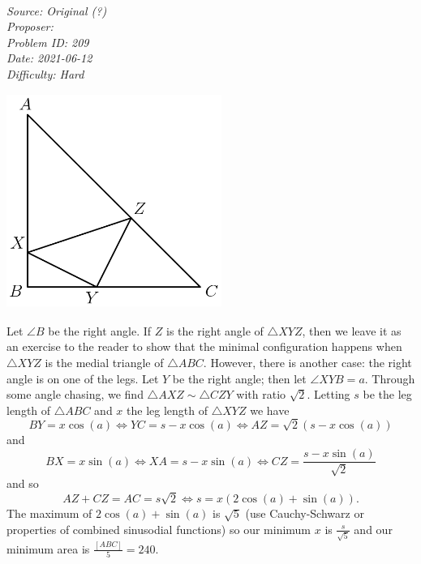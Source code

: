 \SSbreak\\
\emph{Source: Original (?)}\\
\emph{Proposer: \Pmatt}\\ %
\emph{Problem ID: 209}\\
\emph{Date: 2021-06-12}\\
\emph{Difficulty: Hard}\\
\SSbreak

\bigskip

\begin{solution}\hfil\medskip

	\includegraphics[width=7cm,height=7cm]{Sections/Files/O-matt-trianglemin.png}
	
	Let $\angle B$ be the right angle. If $Z$ is the right angle of $\triangle XYZ$, then we leave it as an exercise to the reader to show that the minimal 
	configuration happens when $\triangle XYZ$ is the medial triangle of $\triangle ABC$. However, there is another case: the right angle is on one of the legs. 
	Let $Y$ be the right angle; then let $\angle XYB = a$. Through some angle chasing, we find $\triangle AXZ \sim \triangle CZY$ with ratio $\sqrt{2}$. Letting $s$ be the leg length
	of $\triangle ABC$ and $x$ the leg length of $\triangle XYZ$ we have $$BY = x \cos(a) \iff YC = s - x \cos(a) \iff AZ = \sqrt{2}(s - x\cos(a))$$ and 
	$$BX = x\sin(a) \iff XA = s - x\sin(a) \iff CZ = \frac{s-x\sin(a)}{\sqrt{2}}$$ and so $$AZ + CZ = AC = s\sqrt{2} \iff s = x(2\cos(a) + \sin(a)).$$
	The maximum of $2\cos(a) + \sin(a)$ is $\sqrt{5}$ (use Cauchy-Schwarz or properties of combined sinusodial functions) so our minimum $x$ is $\frac{s}{\sqrt{5}}$
	and our minimum area is $\frac{[ABC]}{5} = \boxed{240}$.
\end{solution}\bigskip